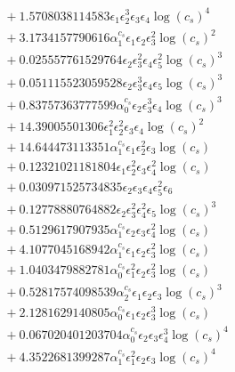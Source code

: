 \documentclass[10pt]{article}
\begin{document}
\begin{align*}
&{}  + 1.5708038114583 \epsilon_{1} \epsilon_{2}^{3} \epsilon_{3} \epsilon_{4} \log{\left(c_{s} \right)}^{4} \\
&{}  + 3.1734157790616 \alpha_{1}^{c_s} \epsilon_{1} \epsilon_{2} \epsilon_{3}^{2} \log{\left(c_{s} \right)}^{2} \\
&{}  + 0.025557761529764 \epsilon_{2} \epsilon_{3}^{2} \epsilon_{4} \epsilon_{5}^{2} \log{\left(c_{s} \right)}^{3} \\
&{}  + 0.051115523059528 \epsilon_{2} \epsilon_{3}^{3} \epsilon_{4} \epsilon_{5} \log{\left(c_{s} \right)}^{3} \\
&{}  + 0.83757363777599 \alpha_{0}^{c_s} \epsilon_{2} \epsilon_{3}^{3} \epsilon_{4} \log{\left(c_{s} \right)}^{3} \\
&{}  + 14.39005501306 \epsilon_{1}^{2} \epsilon_{2}^{2} \epsilon_{3} \epsilon_{4} \log{\left(c_{s} \right)}^{2} \\
&{}  + 14.644473113351 \alpha_{1}^{c_s} \epsilon_{1} \epsilon_{2}^{2} \epsilon_{3} \log{\left(c_{s} \right)} \\
&{}  + 0.12321021181804 \epsilon_{1} \epsilon_{2}^{2} \epsilon_{3} \epsilon_{4}^{2} \log{\left(c_{s} \right)} \\
&{}  + 0.030971525734835 \epsilon_{2} \epsilon_{3} \epsilon_{4} \epsilon_{5}^{2} \epsilon_{6} \\
&{}  + 0.12778880764882 \epsilon_{2} \epsilon_{3}^{2} \epsilon_{4}^{2} \epsilon_{5} \log{\left(c_{s} \right)}^{3} \\
&{}  + 0.5129617907935 \alpha_{1}^{c_s} \epsilon_{2} \epsilon_{3} \epsilon_{4}^{2} \log{\left(c_{s} \right)} \\
&{}  + 4.1077045168942 \alpha_{1}^{c_s} \epsilon_{1} \epsilon_{2} \epsilon_{3}^{2} \log{\left(c_{s} \right)} \\
&{}  + 1.0403479882781 \alpha_{0}^{c_s} \epsilon_{1}^{2} \epsilon_{2} \epsilon_{3}^{2} \log{\left(c_{s} \right)} \\
&{}  + 0.52817574098539 \alpha_{2}^{c_s} \epsilon_{1} \epsilon_{2} \epsilon_{3} \log{\left(c_{s} \right)}^{3} \\
&{}  + 2.1281629140805 \alpha_{0}^{c_s} \epsilon_{1} \epsilon_{2} \epsilon_{3}^{3} \log{\left(c_{s} \right)} \\
&{}  + 0.067020401203704 \alpha_{0}^{c_s} \epsilon_{2} \epsilon_{3} \epsilon_{4}^{3} \log{\left(c_{s} \right)}^{4} \\
&{}  + 4.3522681399287 \alpha_{1}^{c_s} \epsilon_{1}^{2} \epsilon_{2} \epsilon_{3} \log{\left(c_{s} \right)}^{4} \\

\end{align*}
\end{document}
